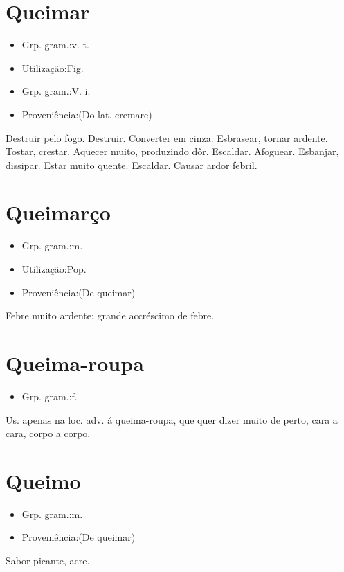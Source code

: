\section{Queimar}
\begin{itemize}
\item {Grp. gram.:v. t.}
\end{itemize}
\begin{itemize}
\item {Utilização:Fig.}
\end{itemize}
\begin{itemize}
\item {Grp. gram.:V. i.}
\end{itemize}
\begin{itemize}
\item {Proveniência:(Do lat. \textunderscore cremare\textunderscore )}
\end{itemize}
Destruir pelo fogo.
Destruir.
Converter em cinza.
Esbrasear, tornar ardente.
Tostar, crestar.
Aquecer muito, produzindo dôr.
Escaldar.
Afoguear.
Esbanjar, dissipar.
Estar muito quente.
Escaldar.
Causar ardor febril.
\section{Queimarço}
\begin{itemize}
\item {Grp. gram.:m.}
\end{itemize}
\begin{itemize}
\item {Utilização:Pop.}
\end{itemize}
\begin{itemize}
\item {Proveniência:(De \textunderscore queimar\textunderscore )}
\end{itemize}
Febre muito ardente; grande accréscimo de febre.
\section{Queima-roupa}
\begin{itemize}
\item {Grp. gram.:f.}
\end{itemize}
Us. apenas na loc. adv. \textunderscore á queima-roupa\textunderscore , que quer dizer \textunderscore muito de perto\textunderscore , \textunderscore cara a cara\textunderscore , \textunderscore corpo a corpo\textunderscore .
\section{Queimo}
\begin{itemize}
\item {Grp. gram.:m.}
\end{itemize}
\begin{itemize}
\item {Proveniência:(De \textunderscore queimar\textunderscore )}
\end{itemize}
Sabor picante, acre.
